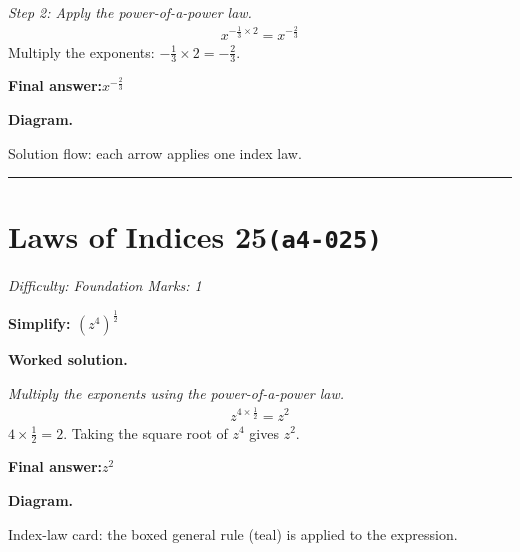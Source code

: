 \documentclass[11pt]{article}
\newcommand{\question}[1]{\par\medskip\noindent\textbf{#1}\par}
\begin{document}
\textit{Step 2: Apply the power-of-a-power law.}
\[\begin{gathered}
x^{-\frac{1}{3} \times 2} = x^{-\frac{2}{3}}
\end{gathered}\]
Multiply the exponents: \( -\frac{1}{3} \times 2 = -\frac{2}{3} \).

\begin{answerbox}
\textbf{Final answer:}\quad \(\displaystyle x^{-\frac{2}{3}}\)
\end{answerbox}
\textbf{Diagram.}

\begin{center}
\end{center}
\small Solution flow: each arrow applies one index law.\normalsize

\medskip\hrule

\section*{Laws of Indices 25\quad\small\texttt{(a4-025)}}
\textit{Difficulty: Foundation \quad\textbar\quad Marks: 1}

\question{Simplify: \( (z^4)^{\frac{1}{2}} \)}

\textbf{Worked solution.}

\textit{Multiply the exponents using the power-of-a-power law.}
\[\begin{gathered}
z^{4 \times \frac{1}{2}} = z^{2}
\end{gathered}\]
\( 4 \times \frac{1}{2} = 2 \). Taking the square root of \( z^4 \) gives \( z^2 \).

\begin{answerbox}
\textbf{Final answer:}\quad \(\displaystyle z^{2}\)
\end{answerbox}
\textbf{Diagram.}

\begin{center}
\end{center}
\small Index-law card: the boxed general rule (teal) is applied to the expression.\normalsize
\end{document}
